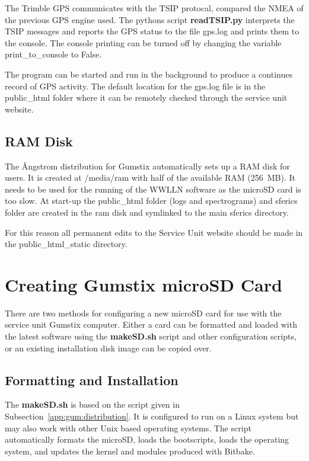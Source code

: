 The Trimble GPS communicates with the TSIP protocal, compared the NMEA of the previous GPS engine used.
The pythons script {\bf readTSIP.py} interprets the TSIP messages and reports the GPS status to the file gps.log and prints them to the console.
The console printing can be turned off by changing the variable print\_to\_console to False.

The program can be started and run in the background to produce a continues record of GPS activity.
The default location for the gps.log file is in the public\_html folder where it can be remotely checked through the service unit website.

\subsection{RAM Disk}

The \r{A}ngstrom distribution for Gumstix automatically sets up a RAM disk for users.
It is created at /media/ram with half of the available RAM (256~MB).
It needs to be used for the running of the WWLLN software as the microSD card is too slow.
At start-up the public\_html folder (logs and spectrograms) and sferics folder are created in the ram disk and symlinked to the main sferics directory.

For this reason all permanent edits to the Service Unit website should be made in the public\_html\_static directory.

\section{Creating Gumstix microSD Card}

There are two methods for configuring a new microSD card for use with the service unit Gumstix computer.
Either a card can be formatted and loaded with the latest software using the {\bf makeSD.sh} script and other configuration scripts, or an existing installation disk image can be copied over.

\subsection{Formatting and Installation}

The {\bf makeSD.sh} is based on the script given in Subsection~\ref{app:gum:distribution}.
It is configured to run on a Linux system but may also work with other Unix based operating systems.
The script automatically formats the microSD, loads the bootscripts, loads the operating system, and updates the kernel and modules produced with Bitbake.

